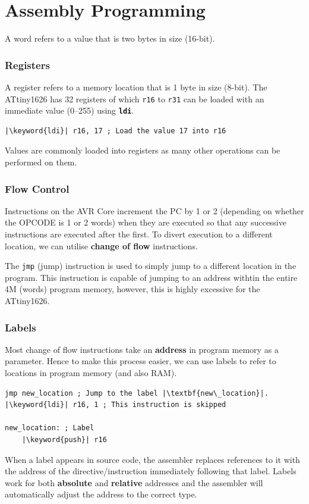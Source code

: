\documentclass{report}
\newcommand{\keyword}[1]{\textcolor[rgb]{0.00,0.50,0.00}{\textbf{#1}}}
\newcommand{\keywordinline}[1]{\textcolor[rgb]{0.00,0.50,0.00}{\textbf{\texttt{#1}}}}
\begin{document}
\part{Assembly Programming}
\begin{definition}[Word]
    A word refers to a value that is two bytes in size (16-bit).
\end{definition}
\section{Registers}
A register refers to a memory location that is 1 byte in size (8-bit).
The ATtiny1626 has 32 registers of which \texttt{r16} to \texttt{r31} can be loaded with an immediate value (\numrange{0}{255}) using \keywordinline{ldi}.
\begin{verbatim}
|\keyword{ldi}| r16, 17 ; Load the value 17 into r16
\end{verbatim}
Values are commonly loaded into registers as many other operations can be performed on them.
\section{Flow Control}
Instructions on the AVR Core increment the PC by 1 or 2 (depending on whether the OPCODE is 1 or 2 words) when they are executed so that any successive
instructions are executed after the first. To divert execution to a different location, we can utilise
\textbf{change of flow} instructions.

The \texttt{jmp} (jump) instruction is used to simply jump to a different location in the program.
This instruction is capable of jumping to an address withtin the entire 4M (words) program memory, however,
this is highly excessive for the ATtiny1626.
\section{Labels}
Most change of flow instructions take an \textbf{address} in program memory as a parameter.
Hence to make this process easier, we can use labels to refer to locations in program memory (and also RAM).
\begin{verbatim}
jmp new_location ; Jump to the label |\textbf{new\_location}|.
|\keyword{ldi}| r16, 1 ; This instruction is skipped

new_location: ; Label
    |\keyword{push}| r16
\end{verbatim}
When a label appears in source code, the assembler replaces references to it with the address of the
directive/instruction immediately following that label. Labels work for both \textbf{absolute} and \textbf{relative}
addresses and the assembler will automatically adjust the address to the correct type.
\end{document}
